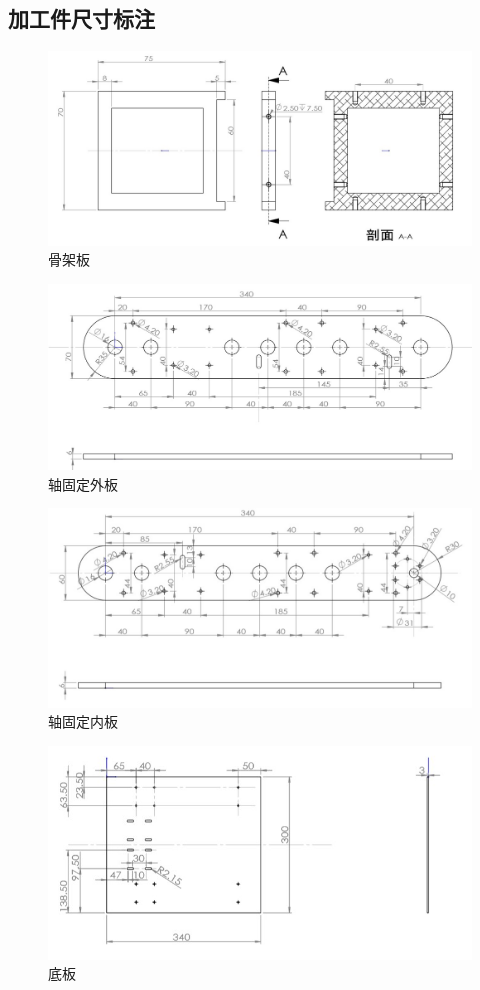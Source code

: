 \documentclass[12pt]{article}
\begin{document}
\begin{CJK}{UTF8}{song}
\subsection{加工件尺寸标注}
 \begin{figure}[H]
\centering
\includegraphics[width=.9\textwidth]{chap4//Fig1.jpg}
\caption{骨架板}
\end{figure}
 \begin{figure}[H]
\centering
\includegraphics[width=.9\textwidth]{chap4//Fig2.jpg}
\caption{轴固定外板}
\end{figure}
 \begin{figure}[H]
\centering
\includegraphics[width=.9\textwidth]{chap4//Fig3.jpg}
\caption{轴固定内板}
\end{figure}
 \begin{figure}[H]
\centering
\includegraphics[width=.9\textwidth]{chap4//Fig4.jpg}
\caption{底板}
\end{figure}

\end{CJK}
\end{document}
